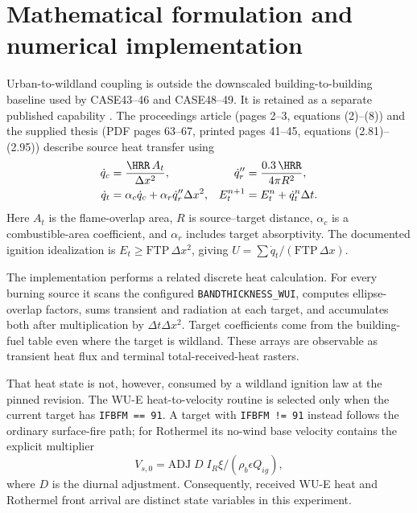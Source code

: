 \section{Mathematical formulation and numerical implementation}
Urban-to-wildland coupling is outside the downscaled
building-to-building baseline used by CASE43--46 and CASE48--49. It is retained
as a separate published capability \cite{PurnomoPCI2024,PurnomoIJWF2024}.
The proceedings article (pages 2--3,
equations (2)--(8)) and the
supplied thesis (PDF pages 63--67, printed pages 41--45, equations
(2.81)--(2.95)) describe source heat transfer using
\begin{align}
 \dot q_c &= \frac{\HRR\,A_t}{\Delta x^2}, &
 \dot q_r'' &= \frac{0.3\,\HRR}{4\pi R^2}, \\
 \dot q_t &= \alpha_c\dot q_c+\alpha_r\dot q_r''\Delta x^2, &
 E_t^{n+1} &= E_t^n+\dot q_t^n\Delta t .
\end{align}
Here $A_t$ is the flame-overlap area, $R$ is source--target distance,
$\alpha_c$ is a combustible-area coefficient, and $\alpha_r$ includes target
absorptivity.  The documented ignition idealization is
$E_t\geq\mathrm{FTP}\,\Delta x^2$, giving
$U=\sum\dot q_t/(\mathrm{FTP}\,\Delta x)$.

The implementation performs a related discrete heat calculation.  For every
burning source it scans the configured \texttt{BANDTHICKNESS\_WUI}, computes
ellipse-overlap factors, sums transient \DFC{} and radiation at each target,
and accumulates both after multiplication by $\Delta t\Delta x^2$.  Target
coefficients come from the building-fuel table even where the target \FBFM{}
is wildland.  These arrays are observable as transient heat flux and terminal
total-received-heat rasters.

That heat state is not, however, consumed by a wildland ignition law at the
pinned revision.  The WU-E heat-to-velocity routine is selected only when the
current target has \texttt{IFBFM == 91}.  A target with \texttt{IFBFM != 91}
instead follows the ordinary surface-fire path; for Rothermel its no-wind base
velocity contains the explicit multiplier
\begin{equation}
 V_{s,0}=\mathrm{ADJ}\;D\;I_R\xi/(\rho_b\epsilon Q_{ig}),
\end{equation}
where $D$ is the diurnal adjustment.  Consequently, received WU-E heat and
Rothermel front arrival are distinct state variables in this experiment.

